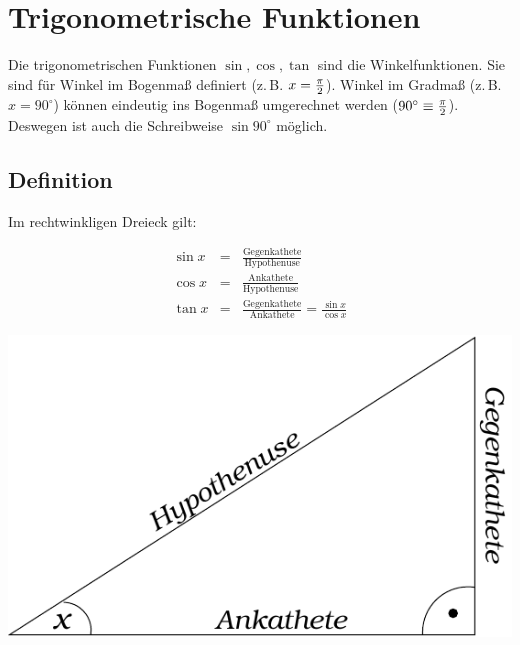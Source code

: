 \section{Trigonometrische Funktionen%
}\label{sec:trigonometrie}

Die trigonometrischen Funktionen $\sin, \cos, \tan$ sind die
Winkelfunktionen. Sie sind für Winkel im Bogenmaß definiert (z.\,B. $ x =
\frac{\pi}{2}$). Winkel im Gradmaß (z.\,B. $ x = 90^\circ$) können
eindeutig ins Bogenmaß umgerechnet werden ($90^\circ \equiv \frac{\pi}{2}$).
Deswegen ist auch die Schreibweise $\sin 90^\circ$ möglich.

\subsection{Definition}
Im rechtwinkligen Dreieck gilt:

\begin{minipage}{.5\linewidth}
\begin{eqnarray*}
 \sin x &=& \frac{\text{Gegenkathete}}{\text{Hypothenuse}}\\
 \cos x &=& \frac{\text{Ankathete}}{\text{Hypothenuse}}\\
 \tan x &=& \frac{\text{Gegenkathete}}{\text{Ankathete}} =
\frac{\sin x}{\cos x}
\end{eqnarray*}
\end{minipage}\hspace{.1\linewidth}
\begin{minipage}{.35\textwidth}
 \includegraphics[width=\textwidth]{img/winkel.pdf}
\end{minipage}

